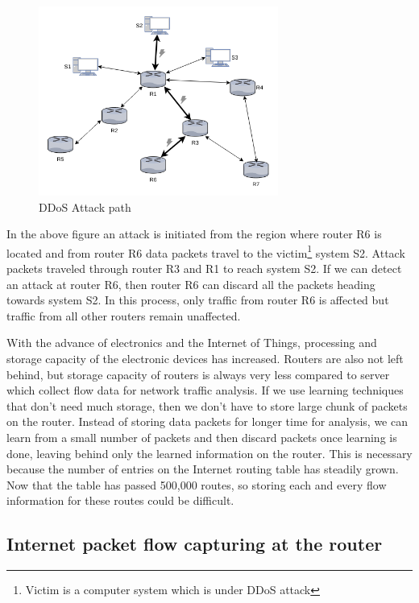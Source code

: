 \documentclass[12pt,oneside,a4paper]{article}
\begin{document}
\begin{figure}[H]
\centering
\includegraphics[width=0.70\textwidth]{attack_path.png}
\caption{DDoS Attack path} \label{fig:attackpath}
\end{figure}


In the above figure an attack is initiated from the region where router R6 is located and from router R6 data packets travel to the victim\footnote{Victim is a computer system which is under DDoS attack} system S2. Attack packets traveled through router R3 and R1 to reach system S2. If we can detect an attack at router R6, then router R6 can discard all the packets heading towards system S2. In this process, only traffic from router R6 is affected but traffic from all other routers remain unaffected.

With the advance of electronics and the Internet of Things, processing and storage capacity of the electronic devices has increased. Routers are also not left behind, but storage capacity of routers is always very less compared to server which collect flow data for network traffic analysis. If we use learning techniques that don't need much storage, then we don't have to store large chunk of packets on the router. Instead of storing data packets for longer time for analysis, we can learn from a small number of packets and then discard packets once learning is done, leaving behind only the learned information on the router. This is necessary because the number of entries on the Internet routing table has steadily grown. Now that the table has passed 500,000 routes\cite{routing-tablesize}, so storing each and every flow information for these routes could be difficult.\par

\subsection{Internet packet flow capturing at the router}
\end{document}
